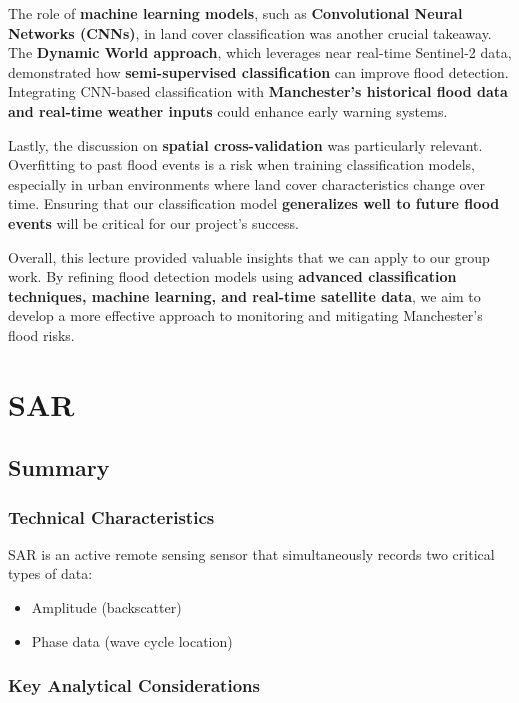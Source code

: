 \documentclass[
  letterpaper,
]{scrbook}
\begin{document}
The role of \textbf{machine learning models}, such as
\textbf{Convolutional Neural Networks (CNNs)}, in land cover
classification was another crucial takeaway. The \textbf{Dynamic World
approach}, which leverages near real-time Sentinel-2 data, demonstrated
how \textbf{semi-supervised classification} can improve flood detection.
Integrating CNN-based classification with \textbf{Manchester's
historical flood data and real-time weather inputs} could enhance early
warning systems.

Lastly, the discussion on \textbf{spatial cross-validation} was
particularly relevant. Overfitting to past flood events is a risk when
training classification models, especially in urban environments where
land cover characteristics change over time. Ensuring that our
classification model \textbf{generalizes well to future flood events}
will be critical for our project's success.

Overall, this lecture provided valuable insights that we can apply to
our group work. By refining flood detection models using
\textbf{advanced classification techniques, machine learning, and
real-time satellite data}, we aim to develop a more effective approach
to monitoring and mitigating Manchester's flood risks.


\chapter{SAR}\label{sar}

\section{Summary}\label{summary-5}

\subsection{Technical Characteristics}\label{technical-characteristics}

SAR is an active remote sensing sensor that simultaneously records two
critical types of data:

\begin{itemize}
\item
  Amplitude (backscatter)
\item
  Phase data (wave cycle location)
\end{itemize}

\subsection{Key Analytical
Considerations}\label{key-analytical-considerations}
\end{document}
